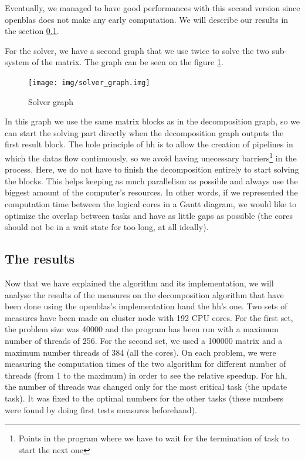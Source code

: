 Eventually, we managed to have good performances with this second version since
openblas does not make any early computation. We will describe our results in
the section \ref{sec:chores}.

For the solver, we have a second graph that we use twice to solve the two
sub-system of the matrix. The graph can be seen on the figure
\ref{fig:solvergraph}.

\begin{figure}[!ht]
  \begin{center}
    \texttt{[image: img/solver\_graph.img]}
    \caption{Solver graph}
    \label{fig:solvergraph}
  \end{center}
\end{figure}

In this graph we use the same matrix blocks as in the decomposition graph, so we
can start the solving part directly when the decomposition graph outputs the
first result block. The hole principle of \gls{hh} is to allow the creation of
pipelines in which the datas flow continuously, so we avoid having unecessary
barriers\footnote{Points in the program where we have to wait for the
termination of task to start the next one} in the process. Here, we do not have
to finish the decomposition entirely to start solving the blocks. This helps
keeping as much parallelism as possible and always use the biggest amount of the
computer's resources. In other words, if we represented the computation time
between the logical cores in a Gantt diagram, we would like to optimize the
overlap between tasks and have as little gaps as possible (the cores should not
be in a wait state for too long, at all ideally).

\clearpage{}
\subsection{The results}
\label{sec:chores}

Now that we have explained the algorithm and its implementation, we will analyse
the results of the measures on the decomposition algorithm that have been done
using the openblas's implementation hand the \gls{hh}'s one. Two sets of
measures have been made on cluster node with 192 CPU cores. For the first set,
the problem size was 40000 and the program has been run with a maximum number of
threads of 256. For the second set, we used a 100000 matrix and a maximum number
threads of 384 (all the cores). On each problem, we were measuring the
computation times of the two algorithm for different number of threads (from 1
to the maximum) in order to see the relative speedup. For \gls{hh}, the number
of threads was changed only for the most critical task (the update task). It was
fixed to the optimal numbers for the other tasks (these numbers were found by
doing first tests measures beforehand).\\

